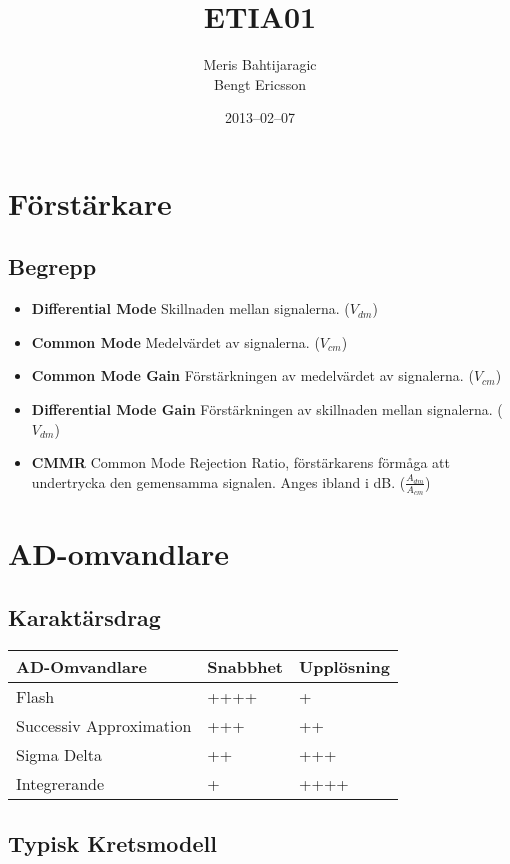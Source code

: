 \documentclass[11pt]{article}
\title{ETIA01}
\author{Meris Bahtijaragic\\Bengt Ericsson}
\date{2013--02--07}
\begin{document}
\maketitle

\section{Förstärkare}
\subsection{Begrepp}
\begin{itemize}
  \item \textbf{Differential Mode} Skillnaden mellan signalerna. ($V_{dm}$)
  \item \textbf{Common Mode} Medelvärdet av signalerna. ($V_{cm}$)
  \item \textbf{Common Mode Gain} Förstärkningen av medelvärdet av signalerna. ($V_{cm}$)
  \item \textbf{Differential Mode Gain} Förstärkningen av skillnaden mellan signalerna. ($V_{dm}$)
  \item \textbf{CMMR} Common Mode Rejection Ratio, förstärkarens förmåga att undertrycka den gemensamma signalen. Anges ibland i dB. ($\frac{A_{dm}}{A_{cm}}$)
\end{itemize}

\section{AD-omvandlare}
\subsection{Karaktärsdrag}
\begin{tabular}{ |l|l|l| }
  \hline
  AD-Omvandlare & Snabbhet & Upplösning \\
  \hline
  Flash & ++++ & + \\
  Successiv Approximation & +++ & ++ \\
  Sigma Delta & ++ & +++\\
  Integrerande & + & ++++ \\
  \hline
\end{tabular}

\subsection{Typisk Kretsmodell}
\end{document}
